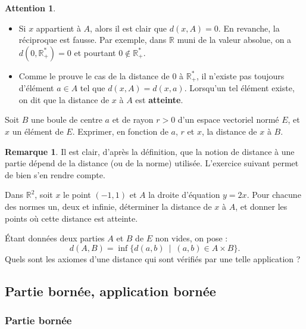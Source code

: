 \documentclass[french]{article}
\newcommand{\R}{\mathbb{R}}
\newcommand{\st}{^*}
\theoremstyle{plain}
\theoremstyle{definition}
\newtheorem*{rmq}{Remarque}
\newtheorem*{attention}{Attention}
\theoremstyle{remark}
\begin{document}
\begin{attention}
\begin{itemize}
	\item Si $x$ appartient à $A$, alors il est clair que $d(x,A)=0$. En revanche, la réciproque est fausse. Par exemple, dans $\R$ muni de la valeur absolue, on a $d(0,\R_+\st)=0$ et pourtant $0\notin\R_+\st$.
	\item Comme le prouve le cas de la distance de $0$ à $\R_+\st$, il n'existe pas toujours d'élément $a\in A$ tel que $d(x,A)=d(x,a)$. Lorsqu'un tel élément existe, on dit que la distance de $x$ à $A$ est \textbf{atteinte}.
\end{itemize}
\end{attention}

\begin{exo}
	Soit $B$ une boule de centre $a$ et de rayon $r>0$ d'un espace vectoriel normé $E$, et $x$ un élément de $E$. Exprimer, en fonction de $a$, $r$ et $x$, la distance de $x$ à $B$.
\end{exo}

\begin{rmq}
	Il est clair, d'après la définition, que la notion de distance à une partie dépend de la distance (ou de la norme) utilisée. L'exercice suivant permet de bien s'en rendre compte.
\end{rmq}

\begin{exo}
	Dans $\R^2$, soit $x$ le point $(-1,1)$ et $A$ la droite d'équation $y=2x$. Pour chacune des normes un, deux et infinie, déterminer la distance de $x$ à $A$, et donner les points où cette distance est atteinte.
\end{exo}

\begin{exo}
	Étant données deux parties $A$ et $B$ de $E$ non vides, on pose : $$d(A,B)=\inf\{d(a,b)\ \mid\ (a,b)\in A\times B\}.$$ Quels sont les axiomes d'une distance qui sont vérifiés par une telle application ?
\end{exo}

\subsection{Partie bornée, application bornée}

\subsubsection*{Partie bornée}
\end{document}
